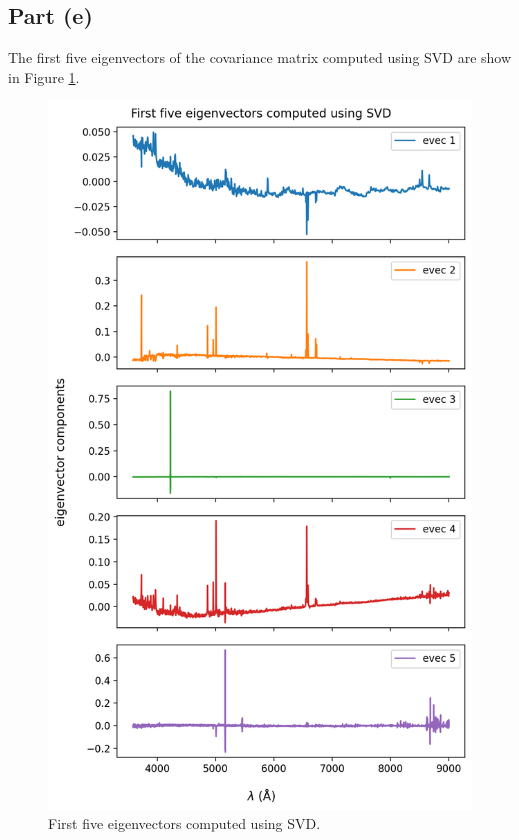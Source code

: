 \documentclass[11pt]{article}
\begin{document}
\subsection{Part (e)}
The first five eigenvectors of the covariance matrix computed using SVD are show in Figure \ref{fig:5evecSVD}.
\begin{figure}[H]
    \centering
    \includegraphics[scale = 0.65]{images/ps6-1e2.png}
    \caption{First five eigenvectors computed using SVD.}
    \label{fig:5evecSVD}
\end{figure}


\end{document}
